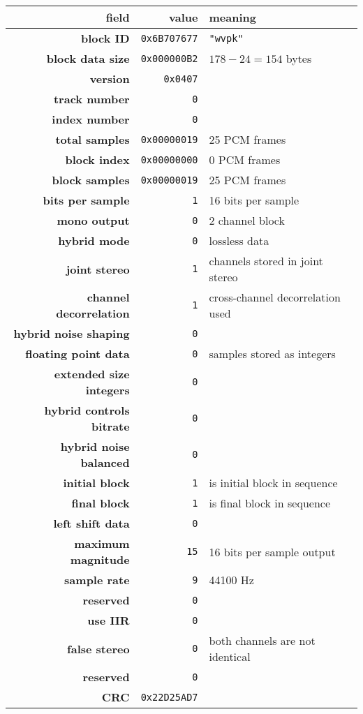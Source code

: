 {
  \begin{tabular}{rrl}
    field & value & meaning \\
    \hline
    \textbf{block ID} & \texttt{0x6B707677} & \texttt{"wvpk"} \\
    \textbf{block data size} & \texttt{0x000000B2} & $178 - 24 = 154$ bytes \\
    \textbf{version} & \texttt{0x0407} \\
    \textbf{track number} & \texttt{0} \\
    \textbf{index number} & \texttt{0} \\
    \textbf{total samples} & \texttt{0x00000019} & 25 PCM frames \\
    \textbf{block index} & \texttt{0x00000000} & 0 PCM frames \\
    \textbf{block samples} & \texttt{0x00000019} & 25 PCM frames \\
    \textbf{bits per sample} & \texttt{1} & 16 bits per sample \\
    \textbf{mono output} & \texttt{0} & 2 channel block \\
    \textbf{hybrid mode} & \texttt{0} & lossless data \\
    \textbf{joint stereo} & \texttt{1} & channels stored in joint stereo \\
    \textbf{channel decorrelation} & \texttt{1} & cross-channel decorrelation used \\
    \textbf{hybrid noise shaping} & \texttt{0} \\
    \textbf{floating point data} & \texttt{0} & samples stored as integers \\
    \textbf{extended size integers} & \texttt{0} \\
    \textbf{hybrid controls bitrate} & \texttt{0} \\
    \textbf{hybrid noise balanced} & \texttt{0} \\
    \textbf{initial block} & \texttt{1} & is initial block in sequence \\
    \textbf{final block} & \texttt{1} & is final block in sequence \\
    \textbf{left shift data} & \texttt{0} \\
    \textbf{maximum magnitude} & \texttt{15} & 16 bits per sample output \\
    \textbf{sample rate} & \texttt{9} & 44100 Hz \\
    \textbf{reserved} & \texttt{0} \\
    \textbf{use IIR} & \texttt{0} \\
    \textbf{false stereo} & \texttt{0} & both channels are not identical \\
    \textbf{reserved} & \texttt{0} \\
    \textbf{CRC} & \texttt{0x22D25AD7} \\
  \end{tabular}
}

